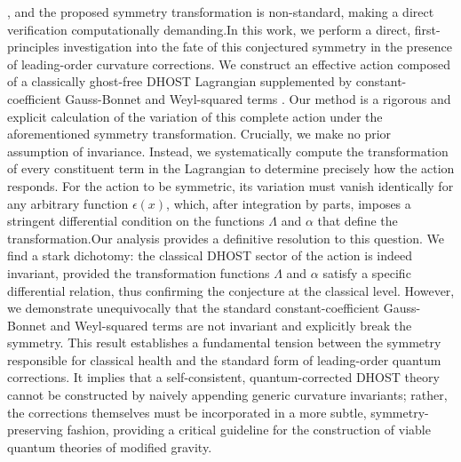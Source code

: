 \documentclass[twocolumn]{aastex631}
\begin{document}
\citep{langlois2018degeneratehigherorderscalartensordhost}, and the proposed symmetry transformation is non-standard, making a direct verification computationally demanding.In this work, we perform a direct, first-principles investigation into the fate of this conjectured symmetry in the presence of leading-order curvature corrections. We construct an effective action composed of a classically ghost-free DHOST Lagrangian \citep{babichev2023rotatingblackholesembedded,brax2025primordialgravitationalwavesdhost} supplemented by constant-coefficient Gauss-Bonnet and Weyl-squared terms \citep{cisterna2025thermodynamicsfourdimensionalregularblack}. Our method is a rigorous and explicit calculation of the variation of this complete action under the aforementioned symmetry transformation. Crucially, we make no prior assumption of invariance. Instead, we systematically compute the transformation of every constituent term in the Lagrangian to determine precisely how the action responds. For the action to be symmetric, its variation must vanish identically for any arbitrary function $\epsilon(x)$, which, after integration by parts, imposes a stringent differential condition on the functions $\Lambda$ and $\alpha$ that define the transformation.Our analysis provides a definitive resolution to this question. We find a stark dichotomy: the classical DHOST sector of the action is indeed invariant, provided the transformation functions $\Lambda$ and $\alpha$ satisfy a specific differential relation, thus confirming the conjecture at the classical level. However, we demonstrate unequivocally that the standard constant-coefficient Gauss-Bonnet and Weyl-squared terms are not invariant and explicitly break the symmetry. This result establishes a fundamental tension between the symmetry responsible for classical health and the standard form of leading-order quantum corrections. It implies that a self-consistent, quantum-corrected DHOST theory cannot be constructed by naively appending generic curvature invariants; rather, the corrections themselves must be incorporated in a more subtle, symmetry-preserving fashion, providing a critical guideline for the construction of viable quantum theories of modified gravity.
\end{document}

